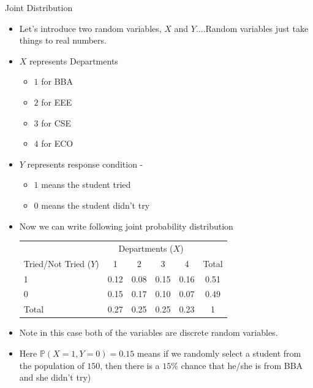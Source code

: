 \documentclass[8pt, usepdftitle = false]{beamer}
\begin{document}
\begin{frame}{Joint Distribution}




\begin{itemize}

\item Let's introduce two random variables, $X$ and $Y$....Random variables just take things to real numbers.

\item $X$ represents Departments  

\begin{itemize}

 \item $1$ for BBA
 \item $2$ for EEE
 \item  $3$ for CSE
 \item $4$ for ECO

\end{itemize}


\item $Y$ represents response condition -  
 


\begin{itemize}

 \item $1$ means the student tried
 \item $0$ means the student didn't try

 
\end{itemize}

\item Now we can write following joint probability distribution


\begin{table}
\centering
  \begin{tabular}{|lcccc|c|}
\hline & \multicolumn{4}{c}{ Departments ($X$) } & \\
\cline { 2 - 6 } Tried/Not Tried ($Y$) & 1 & 2 & 3 & 4 & Total \\
\hline 1 & 0.12 & 0.08 & 0.15 & 0.16 & 0.51 \\
0 & 0.15 & 0.17 & 0.10 & 0.07 & 0.49 \\
\hline Total & 0.27 & 0.25 & 0.25 & 0.23 & 1 \\
\hline
\end{tabular}
\end{table}

\item Note in this case both of the variables are discrete random variables.


\item Here $\mathbb{P}(X = 1, Y = 0) = 0.15$ means if we randomly select a student from the \alert{population of $150$}, then there is a $15\%$ chance that he/she is from BBA and she didn't try)
  
\end{itemize}


\end{frame}
\end{document}
